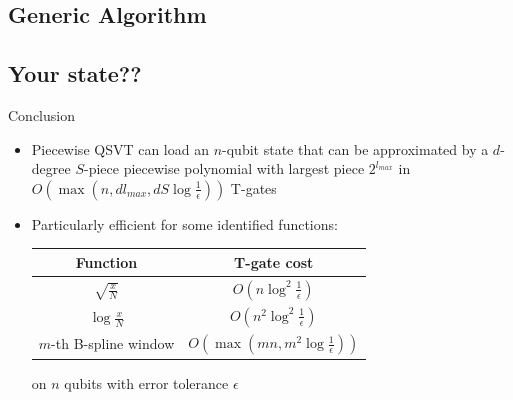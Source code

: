 \documentclass{beamer}
\begin{document}
\subsection{Generic Algorithm}
\subsection{Your state??}
\begin{frame}{Conclusion}
    \begin{itemize}
        \item Piecewise QSVT can load an $n$-qubit state that can be approximated by a $d$-degree $S$-piece piecewise polynomial with largest piece $2^{l_{max}}$ in $O\left(\max\left(n,dl_{max},dS\log \frac{1}{\epsilon}\right)\right)$ T-gates
        \item Particularly efficient for some identified functions:

           \begin{table}[hbtp]
            \centering
            
            \begin{tabular}{|c|c|}
            \hline Function & T-gate cost\\ \hline\hline
                \rule{0pt}{1.25em}$\sqrt{\frac{x}{N}}$ &  $O\left(n\log^2 \frac{1}{\epsilon}\right)$\\[0.5em] \hline
                \rule{0pt}{1.25em}$\log \frac{x}{N}$ &  $O\left(n^2\log^2 \frac{1}{\epsilon}\right)$ \\[0.5em] \hline
                \rule{0pt}{1.25em}$m$-th B-spline window & $O\left(\max \left(mn,m^2 \log \frac{1}{\epsilon}\right)\right)$ \\[0.5em] \hline
            \end{tabular}
        \end{table}
        on $n$ qubits with error tolerance $\epsilon$
    \end{itemize}
\end{frame}
\end{document}
